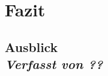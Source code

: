 \newpage
\section{Fazit}

\subsection[Ausblick]{Ausblick
 \\ \textnormal{\small{\textit {Verfasst von ??}}}}